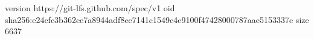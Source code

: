 version https://git-lfs.github.com/spec/v1
oid sha256:e24cfc3b362ce7a8944adf8ee7141c1549c4e9100f47428000787aae5153337e
size 6637
